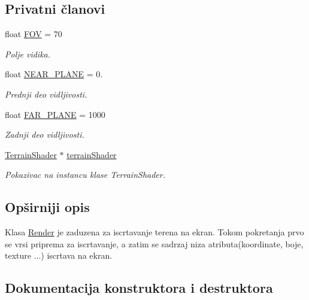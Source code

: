 \subsection*{Privatni članovi}
\begin{DoxyCompactItemize}
\item 
float \hyperlink{classcore_1_1TerrainRenderer_a912eab623ca8c7ca7d8473e30383f831}{F\+OV} = 70
\begin{DoxyCompactList}\small\item\em Polje vidika. \end{DoxyCompactList}\item 
float \hyperlink{classcore_1_1TerrainRenderer_a68bdfd4b42381b4514991fe8c4d08c89}{N\+E\+A\+R\+\_\+\+P\+L\+A\+NE} = 0.
\begin{DoxyCompactList}\small\item\em Prednji deo vidljivosti. \end{DoxyCompactList}\item 
float \hyperlink{classcore_1_1TerrainRenderer_abc56752e01a0b9b0ebfd57b8daa6172c}{F\+A\+R\+\_\+\+P\+L\+A\+NE} = 1000
\begin{DoxyCompactList}\small\item\em Zadnji deo vidljivosti. \end{DoxyCompactList}\item 
\hyperlink{classshader_1_1TerrainShader}{Terrain\+Shader} $\ast$ \hyperlink{classcore_1_1TerrainRenderer_a6db721ffef6f7175977ad243b4ac2834}{terrain\+Shader}
\begin{DoxyCompactList}\small\item\em Pokazivac na instancu klase Terrain\+Shader. \end{DoxyCompactList}\end{DoxyCompactItemize}


\subsection{Opširniji opis}
Klasa \hyperlink{classcore_1_1Render}{Render} je zaduzena za iscrtavanje terena na ekran. Tokom pokretanja prvo se vrsi priprema za iscrtavanje, a zatim se sadrzaj niza atributa(koordinate, boje, texture ...) iscrtava na ekran. 

\subsection{Dokumentacija konstruktora i destruktora}
\mbox{\label{classcore_1_1TerrainRenderer_aef52c32054bf2be3fc5ec160a2d7433b}} 
